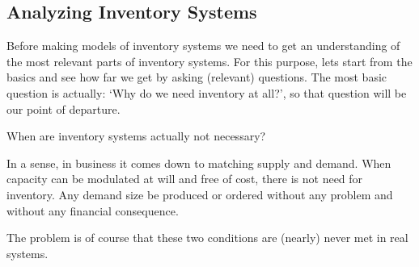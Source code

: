 \subsection{Analyzing Inventory Systems}
\label{sec:analyz-invent-syst}

Before making models of inventory systems we need to get an
understanding of the most relevant parts of inventory systems.  For
this purpose, lets start from the basics and see how far we get by
asking (relevant) questions.  The most basic question is actually:
`Why do we need inventory at all?', so that question will be our point
of departure.

\begin{question}
  When are inventory systems actually not necessary?
\begin{solution}
  In a sense, in business it comes down to matching supply and
  demand. When capacity can be modulated at will and free of cost,
  there is not need for inventory. Any demand size be produced or
  ordered without any problem and without any financial consequence.

  The problem is of course that these two conditions are (nearly)
  never met in real systems.
\end{solution}
\end{question}



